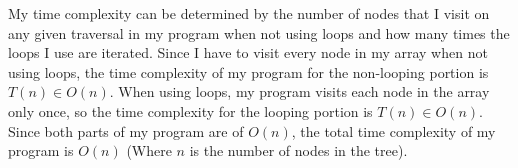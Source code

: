 \documentclass[12pt]{article}
\begin{document}
\noindent \newline My time complexity can be determined by the number of nodes that I visit on any given traversal in my program when not using loops and how many times the loops I use are iterated.
Since I have to visit every node in my array when not using loops, the time complexity of my program for the non-looping portion is $T(n) \in O(n)$.
When using loops, my program visits each node in the array only once, so the time complexity for the looping portion is $T(n) \in O(n)$.
Since both parts of my program are of $O(n)$, the total time complexity of my program is $O(n)$ (Where $n$ is the number of nodes in the tree).
\end{document}
